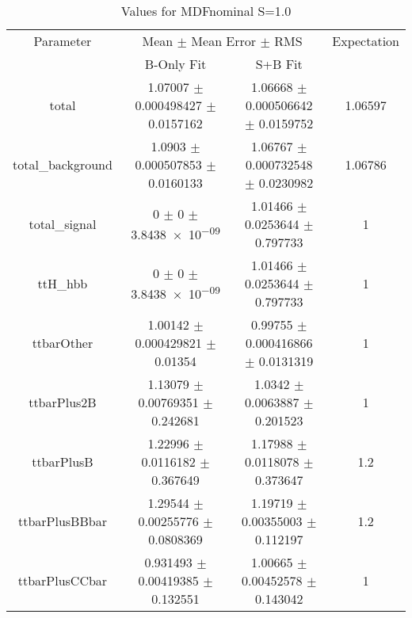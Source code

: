 \begin{table}
\centering
\caption{Values for MDFnominal S=1.0}
\begin{tabular}{cccc}
\toprule
Parameter & \multicolumn{2}{c}{Mean $\pm$ Mean Error $\pm$ RMS} & Expectation\\
 & B-Only Fit & S+B Fit & \\
\midrule
total & \num{1.07007} $\pm$ \num{0.000498427} $\pm$ \num{0.0157162} & \num{1.06668} $\pm$ \num{0.000506642} $\pm$ \num{0.0159752} & \num{1.06597}\\
total\_background & \num{1.0903} $\pm$ \num{0.000507853} $\pm$ \num{0.0160133} & \num{1.06767} $\pm$ \num{0.000732548} $\pm$ \num{0.0230982} & \num{1.06786}\\
total\_signal & \num{0} $\pm$ \num{0} $\pm$ \num{3.8438e-09} & \num{1.01466} $\pm$ \num{0.0253644} $\pm$ \num{0.797733} & \num{1}\\
ttH\_hbb & \num{0} $\pm$ \num{0} $\pm$ \num{3.8438e-09} & \num{1.01466} $\pm$ \num{0.0253644} $\pm$ \num{0.797733} & \num{1}\\
ttbarOther & \num{1.00142} $\pm$ \num{0.000429821} $\pm$ \num{0.01354} & \num{0.99755} $\pm$ \num{0.000416866} $\pm$ \num{0.0131319} & \num{1}\\
ttbarPlus2B & \num{1.13079} $\pm$ \num{0.00769351} $\pm$ \num{0.242681} & \num{1.0342} $\pm$ \num{0.0063887} $\pm$ \num{0.201523} & \num{1}\\
ttbarPlusB & \num{1.22996} $\pm$ \num{0.0116182} $\pm$ \num{0.367649} & \num{1.17988} $\pm$ \num{0.0118078} $\pm$ \num{0.373647} & \num{1.2}\\
ttbarPlusBBbar & \num{1.29544} $\pm$ \num{0.00255776} $\pm$ \num{0.0808369} & \num{1.19719} $\pm$ \num{0.00355003} $\pm$ \num{0.112197} & \num{1.2}\\
ttbarPlusCCbar & \num{0.931493} $\pm$ \num{0.00419385} $\pm$ \num{0.132551} & \num{1.00665} $\pm$ \num{0.00452578} $\pm$ \num{0.143042} & \num{1}\\
\bottomrule
\end{tabular}
\end{table}